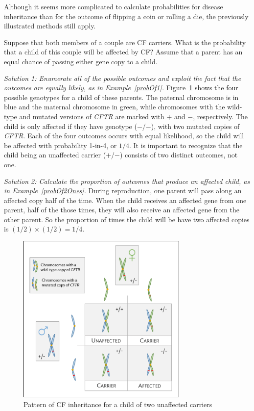 Although it seems more complicated to calculate probabilities for disease inheritance than for the outcome of flipping a coin or rolling a die, the previously illustrated methods still apply.

\begin{example} {Suppose that both members of a couple are CF carriers. What is the probability that a child of this couple will be affected by CF? Assume that a parent has an equal chance of passing either gene copy to a child.}\label{CFInheritanceExample}

\textit{Solution 1: Enumerate all of the possible outcomes and exploit the fact that the outcomes are equally likely, as in Example~\ref{probOf1}.}  Figure~\ref{fig:cfInheritance} shows the four possible genotypes for a child of these parents. The paternal chromosome is in blue and the maternal chromosome in green, while chromosomes with the wild-type and mutated versions of \textit{CFTR} are marked with $+$ and $-$, respectively. The child is only affected if they have genotype ($-$/$-$), with two mutated copies of \textit{CFTR}. Each of the four outcomes occurs with equal likelihood, so the child will be affected with probability 1-in-4, or $1/4$.  It is important to recognize that the child being an unaffected carrier ($+$/$-$) consists of two distinct outcomes, not one. 

\textit{Solution 2:  Calculate the proportion of outcomes that produce an affected child, as in Example~\ref{probOf2Ones}.}  During reproduction, one parent will pass along an affected copy half of the time.  When the child receives an affected gene from one parent, half of the those times, they will also receive an affected gene from the other parent.	So the proportion of times the child will be have two affected copies is $(1/2) \times (1/2) = 1/4$.
\end{example}

\begin{figure}[h!]
	\centering
	\includegraphics[width= 0.75\textwidth]{ch_probability_oi_biostat/figures/cfInheritance/cfInheritance.png}
	\caption{Pattern of CF inheritance for a child of two unaffected carriers}
	\label{fig:cfInheritance}
\end{figure}

